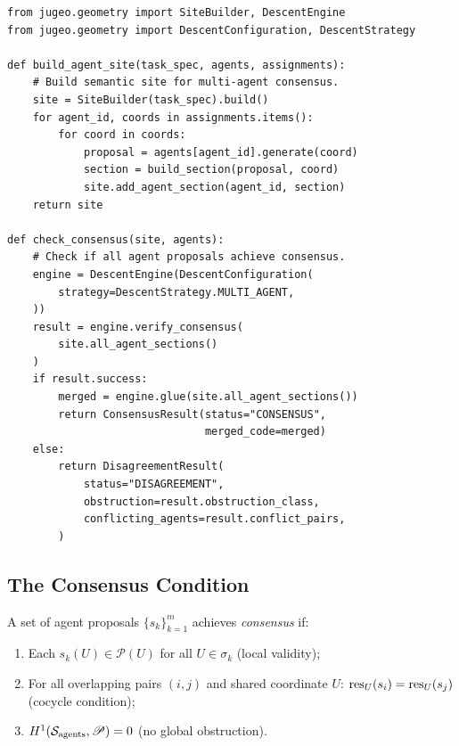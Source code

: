 \documentclass[11pt]{article}
\newcommand{\ProposalSheaf}{\mathscr{P}}
\newcommand{\AgentSite}{\mathcal{S}_{\mathrm{agents}}}
\begin{document}
\begin{lstlisting}[style=jugeo-python,caption={Setting up the multi-agent site.}]
from jugeo.geometry import SiteBuilder, DescentEngine
from jugeo.geometry import DescentConfiguration, DescentStrategy

def build_agent_site(task_spec, agents, assignments):
    # Build semantic site for multi-agent consensus.
    site = SiteBuilder(task_spec).build()
    for agent_id, coords in assignments.items():
        for coord in coords:
            proposal = agents[agent_id].generate(coord)
            section = build_section(proposal, coord)
            site.add_agent_section(agent_id, section)
    return site

def check_consensus(site, agents):
    # Check if all agent proposals achieve consensus.
    engine = DescentEngine(DescentConfiguration(
        strategy=DescentStrategy.MULTI_AGENT,
    ))
    result = engine.verify_consensus(
        site.all_agent_sections()
    )
    if result.success:
        merged = engine.glue(site.all_agent_sections())
        return ConsensusResult(status="CONSENSUS",
                               merged_code=merged)
    else:
        return DisagreementResult(
            status="DISAGREEMENT",
            obstruction=result.obstruction_class,
            conflicting_agents=result.conflict_pairs,
        )
\end{lstlisting}

\subsection{The Consensus Condition}\label{subsec:consensus}

\begin{definition}[Consensus]\label{def:consensus}
A set of agent proposals $\{s_k\}_{k=1}^m$ achieves \emph{consensus}
if:
\begin{enumerate}[label=(\roman*)]
  \item Each $s_k(U) \in \ProposalSheaf(U)$ for all $U \in \sigma_k$
    (local validity);
  \item For all overlapping pairs $(i,j)$ and shared coordinate $U$:
    $\mathrm{res}_U(s_i) = \mathrm{res}_U(s_j)$ (cocycle condition);
  \item $\Hcoh{1}(\AgentSite, \ProposalSheaf) = 0$ (no global
    obstruction).
\end{enumerate}
\end{definition}
\end{document}
